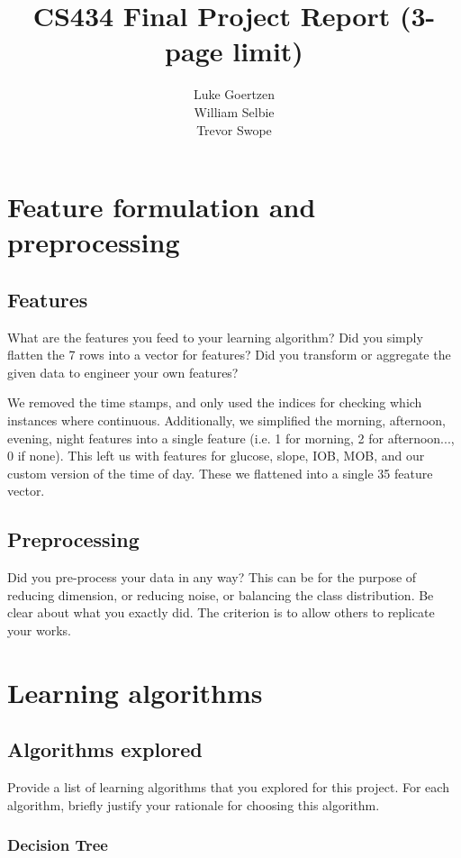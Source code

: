 \documentclass[11pt,a4paper]{article}
\title{CS434 Final Project Report (3-page limit)}
\author{Luke Goertzen \\ William Selbie \\ Trevor Swope}
\date{}
\begin{document}
\maketitle

\section{Feature formulation and preprocessing}

\subsection{Features} 
What are the features you feed to your learning algorithm? Did you simply flatten the 7 rows into a vector for features? Did you transform or aggregate the given data to engineer your own features?

We removed the time stamps, and only used the indices for checking which instances where continuous. Additionally, we simplified the morning, afternoon, evening, night features into a single feature (i.e. 1 for morning, 2 for afternoon..., 0 if none). This left us with features for  glucose, slope, IOB, MOB, and our custom version of the time of day. These we flattened into a single 35 feature vector.


\subsection{Preprocessing}

Did you pre-process your data in any way? This can be for the purpose of reducing dimension, or reducing noise, or balancing the class distribution. Be clear about what you exactly did. The criterion is to allow others to replicate your works.

\section{Learning algorithms}

\subsection{Algorithms explored}
Provide a list of learning algorithms that you explored for this project. For each algorithm, briefly justify your rationale for choosing this algorithm.

\subsubsection{Decision Tree}
\end{document}
